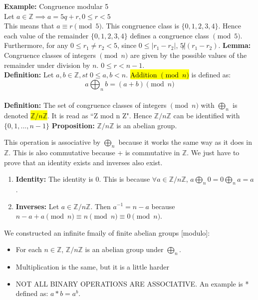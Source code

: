 \documentclass[12pt]{report}
\newcommand{\examples}[1]{{\leavevmode\color{red} #1}}
\newcommand{\definitions}[1]{{\leavevmode\color{OliveGreen} #1}}
\newcommand{\recap}[1]{{\leavevmode\color{teal} #1}}
\newcommand{\proof}[1]{{\leavevmode\color{purple} #1}}
\begin{document}
	\vskip 0.1in
	\examples{
		\textbf{Example: }Congruence modular 5\\
		Let $a\in \mathbb{Z}\implies a=5q+r, 0\leq r<5$\\
		This means that $a\equiv r\pmod 5$. This congruence class is $\{0,1,2,3,4\}$. Hence each value of the remainder $\{0,1,2,3,4\}$ defines a congruence class $\pmod 5$. Furthermore, for any $0\leq r_1\neq r_2<5$, since $0\leq |r_1-r_2|$, $5\not |(r_1-r_2)$.  
	}
	\vskip 0.1in
	\definitions{
	\textbf{Lemma: } Congruence classes of integers $\pmod n$ are given by the possible values of the remainder under division by $n$. $0\leq r<n-1$. \\
	\textbf{Definition: } Let $a,b\in\mathbb{Z}, st\; 0\leq a,b<n$. \hl{Addition $\pmod n$} is defined as: 
	$$a\bigoplus_n b=(a+b)\pmod n$$\\
	\textbf{Definition: }The set of congruence classes of integers $\pmod n$ with $\bigoplus_n$ is denoted \hl{$\mathbb{Z}/n\mathbb{Z}$}. It is read as ``Z mod n Z". Hence $\mathbb{Z}/n\mathbb{Z}$ can be identified with $\{0,1,...,n-1\}$
	}
	\vskip 0.1in
	\definitions{
	\textbf{Proposition:} $\mathbb{Z}/n\mathbb{Z}$ is an abelian group. 
	}
	\vskip 0.1in
	\proof{
		This operation is associative by $\bigoplus_n$ because it works the same way as it does in $\mathbb{Z}$. This is also commutative because + is commutative in $\mathbb{Z}$. We just have to prove that an identity exists and inverses also exist. 
		\begin{enumerate}
			\item \textbf{Identity: }The identity is 0. This is because $\forall a\in \mathbb{Z}/n\mathbb{Z}$, $a\bigoplus_n 0=0\bigoplus_n a=a$. 
			\item \textbf{Inverses: }Let $a\in \mathbb{Z}/n\mathbb{Z}$. Then $a^{-1}=n-a$ because $n-a+a\pmod n\equiv n\pmod n\equiv 0\pmod n$. 
		\end{enumerate}
	}
	\vskip 0.1in
	\recap{
		We constructed an infinite fmaily of finite abelian groups [modulo]: 
		\begin{itemize}
			\item For each $n\in \mathbb{Z}$, $\mathbb{Z}/n\mathbb{Z}$ is an abelian group under $\bigoplus_n$. \\
			\item Multiplication is the same, but it is a little harder
			\item NOT ALL BINARY OPERATIONS ARE ASSOCIATIVE. An example is * defined as: $a*b=a^b$. 
		\end{itemize}
	}
\end{document}
